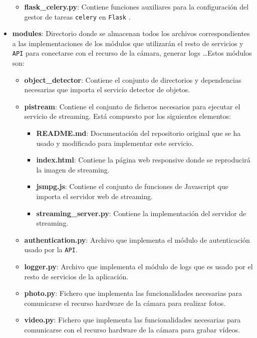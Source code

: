 \begin{itemize}
	\begin{itemize}
	\item \textbf{flask\_celery.py}: Contiene funciones auxiliares para la configuración del gestor de tareas \texttt{celery} \cite{ref15} en \texttt{Flask} \cite{ref14}.
	\end{itemize}

\item \textbf{modules}: Directorio donde se almacenan todos los archivos correspondientes a las implementaciones de los módulos que utilizarán el resto de servicios y \texttt{API} para conectarse con el recurso de la cámara, generar logs \ldots Estos módulos son:

	\begin{itemize}
	\item \textbf{object\_detector}: Contiene el conjunto de directorios y dependencias necesarias que importa el servicio detector de objetos.
	\item \textbf{pistream}: Contiene el conjunto de ficheros necesarios para ejecutar el servicio de streaming. Está compuesto por los siguientes elementos:
		\begin{itemize}
		\item \textbf{README.md}: Documentación del repositorio original que se ha usado y modificado para implementar este servicio.
		\item \textbf{index.html}: Contiene la página web responsive donde se reproducirá la imagen de streaming.
		\item \textbf{jsmpg.js}: Contiene el conjunto de funciones de Javascript que importa el servidor web de streaming.
		\item \textbf{streaming\_server.py}: Contiene la implementación del servidor de streaming.
		\end{itemize}
		
		\item \textbf{authentication.py}: Archivo que implementa el módulo de autenticación usado por la \texttt{API}.
		\item \textbf{logger.py}: Archivo que implementa el módulo de logs que es usado por el resto de servicios de la aplicación.
		\item \textbf{photo.py}: Fichero que implementa las funcionalidades necesarias para comunicarse el recurso hardware de la cámara para realizar fotos.
		\item \textbf{video.py}: Fichero que implementa las funcionalidades necesarias para comunicarse con el recurso hardware de la cámara para grabar vídeos.
				

\end{itemize}
\end{itemize}
